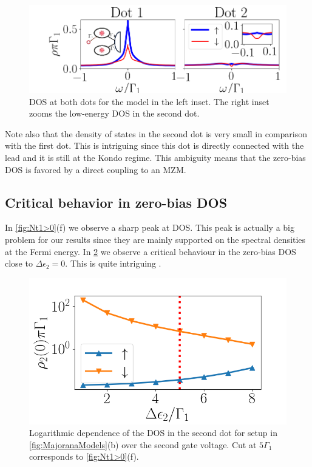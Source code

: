 \begin{figure}[t]
\centering
\includegraphics[scale=0.5]{IMAGES/NRG/IND.png}
\caption{\label{fig:IND} DOS at both dots for the model in the left inset. The right inset zooms the low-energy DOS in the second dot.\protect{} }
\end{figure} 


 Note also that the density of states in the second dot is very small in comparison with the first dot. This is intriguing since this dot is directly connected with the lead and it is still at the Kondo regime. This ambiguity means that the zero-bias DOS is favored by a direct coupling to an MZM.  

\subsection{Critical behavior in  zero-bias DOS }

In \ref{fig:Nt1>0}(f) we observe a sharp peak at DOS. This peak is actually a big problem for our results since they are mainly supported on the spectral densities at the Fermi energy. In \ref{fig:Critical} we observe a critical behaviour in the zero-bias DOS close to $\Delta\epsilon_2 =0$. This is quite intriguing . 

\begin{figure}[t]
\centering
\includegraphics[scale=0.5]{IMAGES/NRG/Critical.png}
\caption{\label{fig:Critical} Logarithmic dependence of the DOS in the second dot for setup in \ref{fig:MajoranaModels}(b) over the second gate voltage. Cut at $5\Gamma_1$ corresponds to \ref{fig:Nt1>0}(f). \protect{} }
\end{figure} 

